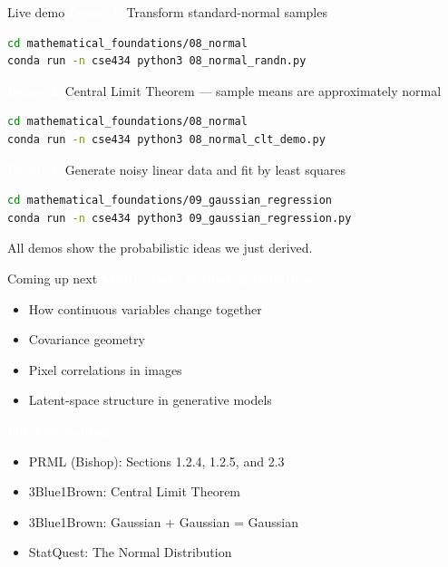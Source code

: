 \documentclass[aspectratio=169]{beamer}
\renewcommand{\textbf}[1]{\textcolor{white}{\bfseries #1}}
\begin{document}
\begin{frame}[fragile]{Live demo}
\textbf{Demo 1:} Transform standard-normal samples
\begin{lstlisting}[language=bash]
cd mathematical_foundations/08_normal
conda run -n cse434 python3 08_normal_randn.py
\end{lstlisting}

\vspace{0.5em}
\textbf{Demo 2:} Central Limit Theorem — sample means are approximately normal
\begin{lstlisting}[language=bash]
cd mathematical_foundations/08_normal
conda run -n cse434 python3 08_normal_clt_demo.py
\end{lstlisting}

\vspace{0.5em}
\textbf{Demo 3:} Generate noisy linear data and fit by least squares
\begin{lstlisting}[language=bash]
cd mathematical_foundations/09_gaussian_regression
conda run -n cse434 python3 09_gaussian_regression.py
\end{lstlisting}

\vspace{0.5em}
All demos show the probabilistic ideas we just derived.
\end{frame}

\begin{frame}[c]{Coming up next}
\textbf{Multivariate normal distributions:}
\begin{itemize}
    \item How continuous variables change together
    \item Covariance geometry
    \item Pixel correlations in images
    \item Latent-space structure in generative models
\end{itemize}

\vspace{1em}
\textbf{Further reading:}
\begin{itemize}
    \item PRML (Bishop): Sections 1.2.4, 1.2.5, and 2.3
    \item 3Blue1Brown: Central Limit Theorem
    \item 3Blue1Brown: Gaussian + Gaussian = Gaussian
    \item StatQuest: The Normal Distribution
\end{itemize}
\end{frame}
\end{document}
